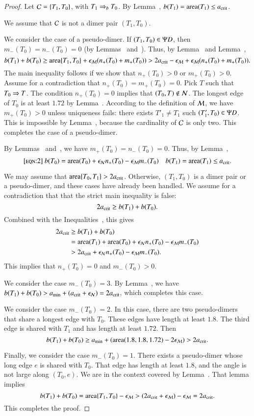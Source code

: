 \begin{proof}  
  Let $\mathcal C = \{T_1,T_0\}$, with $T_1\Rightarrow_{b} T_0$. By
  Lemma~, $b(T_1)={\operatorname{area}}(T_1)\le a_\text{crit}$.

  We assume that $\mathcal C$ is not a dimer pair $(T_1,T_0)$.

  We consider the case of a pseudo-dimer.  If $(T_1,T_0)\in\Psi D$, then
  $m_-(T_0)=n_-(T_0)=0$ (by Lemmas~
  and~).  Thus, by Lemma~ and
  Lemma~,
\[
b(T_1)+b(T_0) 
\ge {\operatorname{area}}\{T_1,T_0\} + \epsilon_{\mathcal M} (n_+(T_0) + m_+(T_0)) 
> 2a_\text{crit} - \epsilon_{\mathcal M}  + \epsilon_{\mathcal M} (n_+(T_0)+m_+(T_0)).
\]
The main inequality follows if we show that $n_+(T_0)>0$ or
$m_+(T_0)>0$.  Assume for a contradiction that $n_+(T_0)=m_+(T_0)=0$.
Pick $T$ such that $T_0\Rightarrow T$.  The condition $n_+(T_0)=0$ implies
that $(T_0,T)\not\in\mathcal N$.  
The longest edge of $T_0$ is at least $1.72$ by Lemma~.
According to the definition of $\mathcal M$, we have
$m_+(T_0)>0$ unless uniqueness fails: there exists $T'_1\ne T_1$ such
$(T'_1,T_0)\in\Psi D$.  This is impossible by Lemma~, because the cardinality of
$\mathcal C$ is only two.  This completes the case of a pseudo-dimer.

By Lemmas~ and~, we have
$m_+(T_0)=n_-(T_0)=0$.  Thus,
by Lemma~,
\begin{equation}\libel{eqn:2}
b(T_0) = \area(T_0) + \epsN n_+(T_0) - \epsM m_-(T_0)
\quad b(T_1) = \area(T_1) \le \acrit.
\end{equation}

We may assume that ${\operatorname{area}}\{T_0,T_1\}> 2a_\text{crit}$.  Otherwise,
$(T_1,T_0)$ is a dimer pair or a pseudo-dimer, and these cases have
already been handled.  We assume for a contradiction that that the
strict main inequality is false:
\[
2a_\text{crit} \ge b(T_1) + b(T_0).
\]
Combined with the Inequalities~,
this gives
\begin{align*}
2a_\text{crit} &\ge b(T_1) + b(T_0) \\
&= {\operatorname{area}}(T_1) + {\operatorname{area}}(T_0) +\epsilon_{\mathcal N} n_+(T_0) - \epsilon_{\mathcal M} m_-(T_0)\\
&> 2a_\text{crit} + \epsilon_{\mathcal N} n_+(T_0) - \epsilon_{\mathcal M} m_-(T_0).
\end{align*}
This implies that $n_+(T_0)=0$ and $m_-(T_0) > 0$.

We consider the case $m_-(T_0)= 3$.  By Lemma~, we have
$b(T_1) + b(T_0) > a_\text{min} + (a_\text{crit} + \epsilon_{\mathcal N}) = 2a_\text{crit}$, which completes
this case.

We consider the case $m_-(T_0)=2$.  In this case, there are two
pseudo-dimers that share a longest edge with $T_0$.  These edges have
length at least $1.8$. The third edge is shared with $T_1$ and has
length at least $1.72$.  Then
\[
b(T_1)+b(T_0) 
\ge a_\text{min} + ({\operatorname{area}} (1.8,1.8,1.72) - 2\epsilon_{\mathcal M}) > 2a_\text{crit}.
\]

Finally, we consider the case $m_-(T_0)=1$.  There exists a
pseudo-dimer whose long edge $e$ is shared with $T_0$.  That edge has
length at least $1.8$, and the angle is not large along $(T_0,e)$. We
are in the context covered by Lemma~.  That lemma
implies
\[
b(T_1) + b(T_0) 
= {\operatorname{area}}\{T_1,T_0\} - \epsilon_{\mathcal M} 
> (2a_\text{crit}  +\epsilon_{\mathcal M}) - \epsilon_{\mathcal M} = 2a_\text{crit}.
\]
This completes the proof.
\end{proof}

